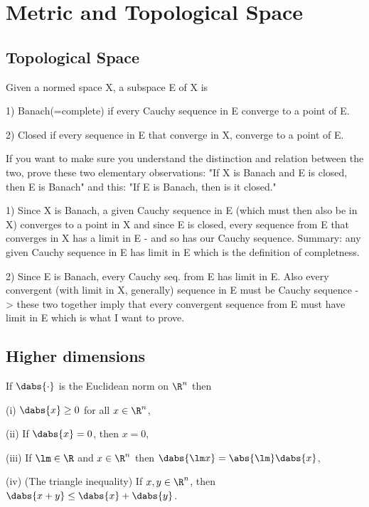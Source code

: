 

\chapter{Metric and Topological Space}



\section{Topological Space}






\qcutline

Given a normed space X, a subspace E of X is

1) Banach(=complete) if every Cauchy sequence in E converge to a point of E.

2) Closed if every sequence in E that converge in X, converge to a point of E.

If you want to make sure you understand the distinction and relation between the two, prove these two elementary observations: "If X is Banach and E is closed, then E is Banach" and this: "If E is Banach, then is it closed."

1) Since X is Banach, a given Cauchy sequence in E (which must then also be in X) converges to a point in X and since E is closed, every sequence from E that converges in X has a limit in E - and so has our Cauchy sequence. Summary: any given Cauchy sequence in E has limit in E which is the definition of completness.

2) Since E is Banach, every Cauchy seq. from E has limit in E. Also every convergent (with limit in X, generally) sequence in E must be Cauchy sequence -> these two together imply that every convergent sequence from E must have limit in E which is what I want to prove.




\qcutline

\section{Higher dimensions}

\begin{definition}\label{def:norm_metop}
If $\dabs{\cdot}$ is the Euclidean norm on $\R^n$ then
\ben
\item [(i)] $\dabs{x} \geq 0$ for all $x\in \R^n$,
\item [(ii)] If $\dabs{x} = 0$, then $x=0$,
\item [(iii)] If $\lm \in \R$ and $x\in \R^n$ then $\dabs{\lm x} = \abs{\lm}\dabs{x}$,
\item [(iv)] (The triangle inequality) If $x,y\in \R^n$, then $\dabs{x+y} \leq \dabs{x} + \dabs{y}$.
\een
\end{definition}

